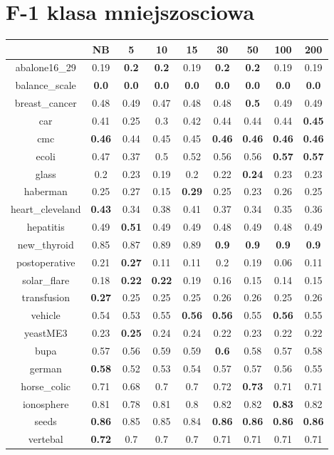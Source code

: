 \documentclass{article}%
\begin{document}
%
\section*{F{-}1 klasa mniejszosciowa}%
\begin{tabular}{c|cccccccc}%
\hline%
&NB&5&10&15&30&50&100&200\\%
\hline%
abalone16\_29&0.19&\textbf{0.2}&\textbf{0.2}&0.19&\textbf{0.2}&\textbf{0.2}&0.19&0.19\\%
\hline%
balance\_scale&\textbf{0.0}&\textbf{0.0}&\textbf{0.0}&\textbf{0.0}&\textbf{0.0}&\textbf{0.0}&\textbf{0.0}&\textbf{0.0}\\%
\hline%
breast\_cancer&0.48&0.49&0.47&0.48&0.48&\textbf{0.5}&0.49&0.49\\%
\hline%
car&0.41&0.25&0.3&0.42&0.44&0.44&0.44&\textbf{0.45}\\%
\hline%
cmc&\textbf{0.46}&0.44&0.45&0.45&\textbf{0.46}&\textbf{0.46}&\textbf{0.46}&\textbf{0.46}\\%
\hline%
ecoli&0.47&0.37&0.5&0.52&0.56&0.56&\textbf{0.57}&\textbf{0.57}\\%
\hline%
glass&0.2&0.23&0.19&0.2&0.22&\textbf{0.24}&0.23&0.23\\%
\hline%
haberman&0.25&0.27&0.15&\textbf{0.29}&0.25&0.23&0.26&0.25\\%
\hline%
heart\_cleveland&\textbf{0.43}&0.34&0.38&0.41&0.37&0.34&0.35&0.36\\%
\hline%
hepatitis&0.49&\textbf{0.51}&0.49&0.49&0.48&0.49&0.48&0.49\\%
\hline%
new\_thyroid&0.85&0.87&0.89&0.89&\textbf{0.9}&\textbf{0.9}&\textbf{0.9}&\textbf{0.9}\\%
\hline%
postoperative&0.21&\textbf{0.27}&0.11&0.11&0.2&0.19&0.06&0.11\\%
\hline%
solar\_flare&0.18&\textbf{0.22}&\textbf{0.22}&0.19&0.16&0.15&0.14&0.15\\%
\hline%
transfusion&\textbf{0.27}&0.25&0.25&0.25&0.26&0.26&0.25&0.26\\%
\hline%
vehicle&0.54&0.53&0.55&\textbf{0.56}&\textbf{0.56}&0.55&\textbf{0.56}&0.55\\%
\hline%
yeastME3&0.23&\textbf{0.25}&0.24&0.24&0.22&0.23&0.22&0.22\\%
\hline%
bupa&0.57&0.56&0.59&0.59&\textbf{0.6}&0.58&0.57&0.58\\%
\hline%
german&\textbf{0.58}&0.52&0.53&0.54&0.57&0.57&0.56&0.55\\%
\hline%
horse\_colic&0.71&0.68&0.7&0.7&0.72&\textbf{0.73}&0.71&0.71\\%
\hline%
ionosphere&0.81&0.78&0.81&0.8&0.82&0.82&\textbf{0.83}&0.82\\%
\hline%
seeds&\textbf{0.86}&0.85&0.85&0.84&\textbf{0.86}&\textbf{0.86}&\textbf{0.86}&\textbf{0.86}\\%
\hline%
vertebal&\textbf{0.72}&0.7&0.7&0.7&0.71&0.71&0.71&0.71\\%
\hline%
\end{tabular}
\end{document}
